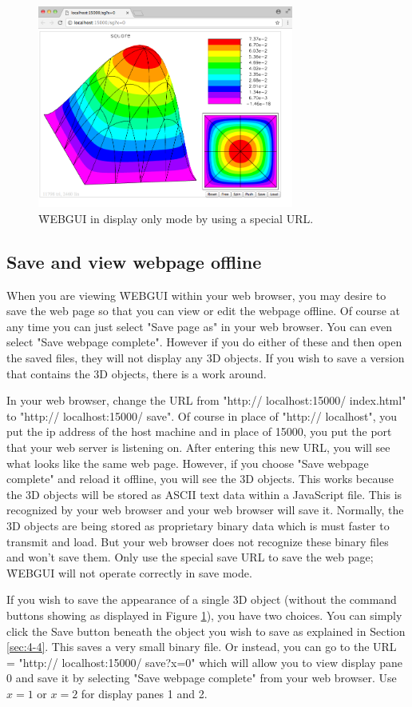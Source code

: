 \begin{figure}[H]
\centering
\includegraphics[width=0.75\textwidth]{pix/sg.png}
\caption{\f{WEBGUI} in display only mode by using a special URL.}
\label{fig:4-2}
\end{figure} 

\subsection{Save and view webpage offline}
\label{sec:4-3}

When you are viewing \f{WEBGUI} within your web browser, you may desire to save the web page so that you can 
view or edit the webpage offline. Of course at any time you can just select "Save page as" in your web browser. You can
even select "Save webpage complete". However if you do either of these and then open the saved files, they will not display
any 3D objects. If you wish to save a version that contains the 3D objects, there is a work around.

In your web browser, change the URL from "http:// localhost:15000/ index.html" to "http:// localhost:15000/ save". Of course
in place of "http:// localhost", you put the ip address of the host machine and in place of 15000, you put the port
that your web server is listening on. After entering this new URL, you will see what looks like the same web page. However,
if you choose "Save webpage complete" and reload it offline, you will see the 3D objects. This works because the 3D objects
will be stored as ASCII text data within a JavaScript file. This is recognized by your web browser and your web browser will
save it. Normally, the 3D objects are being stored as proprietary binary data which is must faster to transmit and load. But your
web browser does not recognize these binary files and won't save them. Only use the special save URL to save the web page;
\f{WEBGUI} will not operate correctly in save mode.

If you wish to save the appearance of a single 3D object (without the command buttons showing as displayed in Figure \ref{fig:4-2}), 
you have two choices. You can simply click the Save button
beneath the object you wish to save as explained in Section \ref{sec:4-4}. This saves a very small binary file. Or instead, 
you can go to the URL = "http:// localhost:15000/ save?x=0" which will allow you to view display pane 0 and save it by selecting
"Save webpage complete" from your web browser. Use $x=1$ or $x=2$ for display panes 1 and 2.

